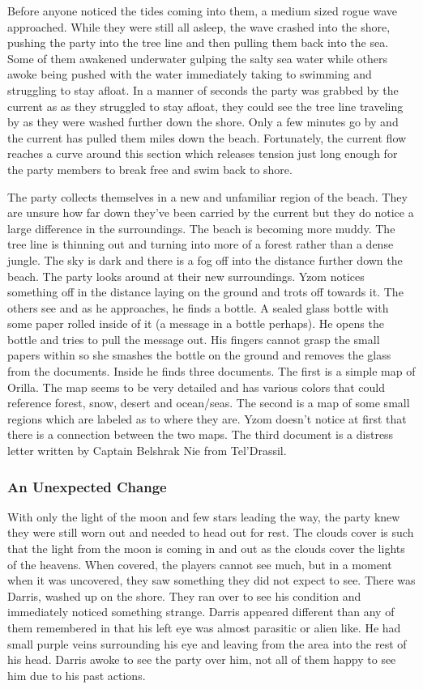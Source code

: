 Before anyone noticed the tides coming into them, a medium sized rogue wave approached. While they were still all asleep, the wave crashed into the shore, pushing the party into the tree line and then pulling them back into the sea. Some of them awakened underwater gulping the salty sea water while others awoke being pushed with the water immediately taking to swimming and struggling to stay afloat. In a manner of seconds the party was grabbed by the current as as they struggled to stay afloat, they could see the tree line traveling by as they were washed further down the shore. Only a few minutes go by and the current has pulled them miles down the beach. Fortunately, the current flow reaches a curve around this section which releases tension just long enough for the party members to break free and swim back to shore.

The party collects themselves in a new and unfamiliar region of the beach. They are unsure how far down they've been carried by the current but they do notice a large difference in the surroundings. The beach is becoming more muddy. The tree line is thinning out and turning into more of a forest rather than a dense jungle. The sky is dark and there is a fog off into the distance further down the beach. The party looks around at their new surroundings. Yzom notices something off in the distance laying on the ground and trots off towards it. The others see and as he approaches, he finds a bottle. A sealed glass bottle with some paper rolled inside of it (a message in a bottle perhaps). He opens the bottle and tries to pull the message out. His fingers cannot grasp the small papers within so she smashes the bottle on the ground and removes the glass from the documents. Inside he finds three documents. The first is a simple map of Orilla. The map seems to be very detailed and has various colors that could reference forest, snow, desert and ocean/seas. The second is a map of some small regions which are labeled as to where they are. Yzom doesn't notice at first that there is a connection between the two maps. The third document is a distress letter written by Captain Belshrak Nie from Tel'Drassil.

\subsubsection{An Unexpected Change}

With only the light of the moon and few stars leading the way, the party knew they were still worn out and needed to head out for rest. The clouds cover is such that the light from the moon is coming in and out as the clouds cover the lights of the heavens. When covered, the players cannot see much, but in a moment when it was uncovered, they saw something they did not expect to see. There was Darris, washed up on the shore. They ran over to see his condition and immediately noticed something strange. Darris appeared different than any of them remembered in that his left eye was almost parasitic or alien like. He had small purple veins surrounding his eye and leaving from the area into the rest of his head. Darris awoke to see the party over him, not all of them happy to see him due to his past actions.

